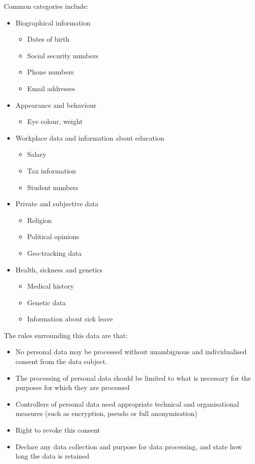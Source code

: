 \documentclass[11pt,a4paper,titlepage,dvipsnames,cmyk]{scrartcl}
\begin{document}
Common categories include:
\begin{itemize}
    \item Biographical information
    \begin{itemize}
        \item Dates of birth
        \item Social security numbers
        \item Phone numbers
        \item Email addresses
    \end{itemize}
    \item Appearance and behaviour
    \begin{itemize}
        \item Eye colour, weight
    \end{itemize}
    \item Workplace data and information about education
    \begin{itemize}
        \item Salary
        \item Tax information
        \item Student numbers
    \end{itemize}
    \item Private and subjective data
    \begin{itemize}
        \item Religion
        \item Political opinions
        \item Geo-tracking data
    \end{itemize}
    \item Health, sickness and genetics
    \begin{itemize}
        \item Medical history
        \item Genetic data
        \item Information about sick leave
    \end{itemize}
\end{itemize}

The rules surrounding this data are that:
\begin{itemize}
    \item No personal data may be processed without unambiguous and individualised consent from the data subject.
    \item The processing of personal data should be limited to what is necessary for the purposes for which they are processed
    \item Controllers of personal data need appropriate technical and organisational measures (such as encryption, pseudo or full anonymisation)
    \item Right to revoke this consent
    \item Declare any data collection and purpose for data processing, and state how long the data is retained
\end{itemize}
\end{document}
